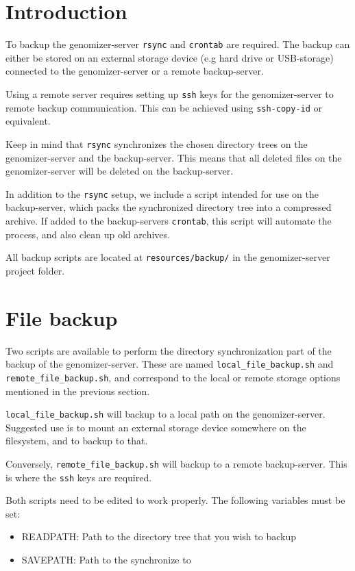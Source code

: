 \section{Introduction}
To backup the genomizer-server \texttt{rsync} and \texttt{crontab} are
required. The backup can either be stored on an external storage
device (e.g hard drive or USB-storage) connected to the
genomizer-server or a remote backup-server.

Using a remote server requires setting up \texttt{ssh} keys for the
genomizer-server to remote backup communication. This can be achieved
using \texttt{ssh-copy-id} or equivalent.

Keep in mind that \texttt{rsync} synchronizes the chosen directory
trees on the genomizer-server and the backup-server. This means that
all deleted files on the genomizer-server will be deleted on the
backup-server.

In addition to the \texttt{rsync} setup, we include a script intended
for use on the backup-server, which packs the synchronized directory
tree into a compressed archive. If added to the backup-servers \texttt{crontab},
this script will automate the process, and also clean up old archives.

All backup scripts are located at \texttt{resources/backup/} in the
genomizer-server project folder.



\section{File backup}

Two scripts are available to perform the directory synchronization
part of the backup of the genomizer-server. These are named
\texttt{local\_file\_backup.sh} and \texttt{remote\_file\_backup.sh},
and correspond to the local or remote storage options mentioned in the
previous section.

\texttt{local\_file\_backup.sh} will backup to a local path on the
genomizer-server. Suggested use is to mount an external storage device
somewhere on the filesystem, and to backup to that.

Conversely, \texttt{remote\_file\_backup.sh} will backup to a remote
backup-server. This is where the \texttt{ssh} keys are required.

Both scripts need to be edited to work properly. The following
variables must be set:

\begin{itemize}
\item READPATH: Path to the directory tree that you wish to backup
\item SAVEPATH: Path to the synchronize to
\end{itemize}

